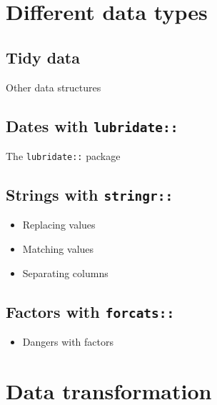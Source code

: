 \documentclass[]{book}
\providecommand{\tightlist}{%
  \setlength{\itemsep}{0pt}\setlength{\parskip}{0pt}}
\begin{document}
\hypertarget{different-data-types}{%
\chapter{Different data types}\label{different-data-types}}

\hypertarget{tidy-data}{%
\section{Tidy data}\label{tidy-data}}

Other data structures

\hypertarget{dates-with-lubridate}{%
\section{\texorpdfstring{Dates with \texttt{lubridate::}}{Dates with lubridate::}}\label{dates-with-lubridate}}

The \texttt{lubridate::} package

\hypertarget{strings-with-stringr}{%
\section{\texorpdfstring{Strings with \texttt{stringr::}}{Strings with stringr::}}\label{strings-with-stringr}}

\begin{itemize}
\tightlist
\item
  Replacing values
\item
  Matching values
\item
  Separating columns
\end{itemize}

\hypertarget{factors-with-forcats}{%
\section{\texorpdfstring{Factors with \texttt{forcats::}}{Factors with forcats::}}\label{factors-with-forcats}}

\begin{itemize}
\tightlist
\item
  Dangers with factors
\end{itemize}

\hypertarget{data-transformation}{%
\chapter{Data transformation}\label{data-transformation}}
\end{document}
